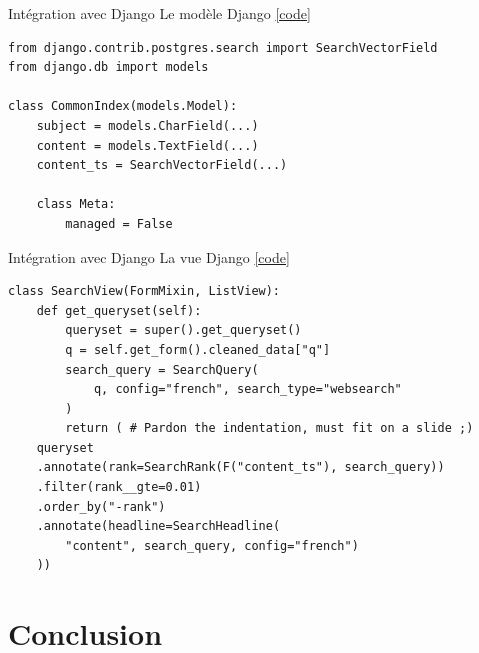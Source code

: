 \documentclass{beamer}
\begin{document}
\begin{frame}[fragile]{Intégration avec Django}
    Le modèle Django \hfill  \href{https://github.com/gip-inclusion/itou-communaute-django/blob/b19e70216affb2e27d38f946ce9a9500ffa7be35/lacommunaute/search/models.py}{[code]}
    \begin{verbatim}
from django.contrib.postgres.search import SearchVectorField
from django.db import models

class CommonIndex(models.Model):
    subject = models.CharField(...)
    content = models.TextField(...)
    content_ts = SearchVectorField(...)

    class Meta:
        managed = False
    \end{verbatim}
\end{frame}

\begin{frame}[fragile]{Intégration avec Django}
    La vue Django \hfill \href{https://github.com/gip-inclusion/itou-communaute-django/blob/b19e70216affb2e27d38f946ce9a9500ffa7be35/lacommunaute/search/views.py}{[code]}
    \begin{verbatim}
class SearchView(FormMixin, ListView):
    def get_queryset(self):
        queryset = super().get_queryset()
        q = self.get_form().cleaned_data["q"]
        search_query = SearchQuery(
            q, config="french", search_type="websearch"
        )
        return ( # Pardon the indentation, must fit on a slide ;)
    queryset
    .annotate(rank=SearchRank(F("content_ts"), search_query))
    .filter(rank__gte=0.01)
    .order_by("-rank")
    .annotate(headline=SearchHeadline(
        "content", search_query, config="french")
    ))
    \end{verbatim}
\end{frame}


\section{Conclusion}
\end{document}
